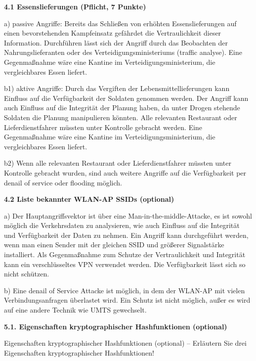 \documentclass[ngerman]{fbi-aufgabenblatt}
\begin{document}
%
%
\newpage
{}

\textbf{4.1 Essenslieferungen (Pflicht, 7 Punkte)}

a) passive Angriffe: Bereits das Schließen von erhöhten Essenslieferungen auf einen bevorstehenden Kampfeinsatz gefährdet die Vertraulichkeit dieser Information. Durchführen lässt sich der Angriff durch das Beobachten der Nahrungslieferanten oder des Verteidigungsministeriums (traffic analyse). Eine Gegenmaßnahme wäre eine Kantine im Verteidigungsministerium, die vergleichbares Essen liefert. 

b1) aktive Angriffe: Durch das Vergiften der Lebensmittellieferungen kann Einfluss auf die Verfügbarkeit der Soldaten genommen werden. Der Angriff kann auch Einfluss auf die Integrität der Planung haben, da unter Drogen stehende Soldaten die Planung manipulieren könnten. Alle relevanten Restaurant oder Lieferdienstfahrer müssten unter Kontrolle gebracht werden. Eine Gegenmaßnahme wäre eine Kantine im Verteidigungsministerium, die vergleichbares Essen liefert.
 
b2) Wenn alle relevanten Restaurant oder Lieferdienstfahrer müssten unter Kontrolle gebracht wurden, sind auch weitere Angriffe auf die Verfügbarkeit per denail of service oder flooding möglich.

\textbf{4.2 Liste bekannter WLAN-AP SSIDs (optional)}

a) Der Hauptangriffsvektor ist über eine Man-in-the-middle-Attacke, es ist sowohl möglich die Verkehrsdaten zu analysieren, wie auch Einfluss auf die Integrität und Verfügbarkeit der Daten zu nehmen. Ein Angriff kann durchgeführt werden, wenn man einen Sender mit der gleichen SSID und größerer Signalstärke installiert.
Als Gegenmaßnahme zum Schutze der Vertraulichkeit und Integrität kann ein verschlüsseltes VPN verwendet werden. Die Verfügbarkeit lässt sich so nicht schützen.

b) Eine denail of Service Attacke ist möglich, in dem der WLAN-AP mit vielen Verbindungsanfragen überlastet wird. Ein Schutz ist nicht möglich, außer es wird auf eine andere Technik wie UMTS gewechselt. 


\newpage
{}

\textbf{5.1. Eigenschaften kryptographischer Hashfunktionen (optional)}

Eigenschaften kryptographischer Hashfunktionen (optional) – Erläutern Sie drei Eigenschaften kryptographischer Hashfunktionen!
\end{document}

